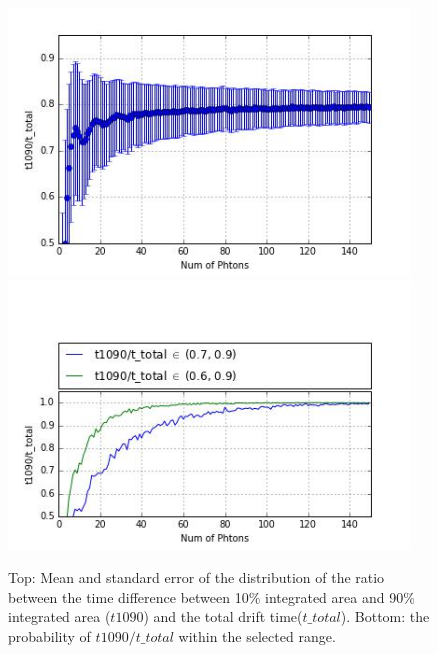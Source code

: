 \begin{figure}[!ht]
  \centering
  \includegraphics[width=0.95\textwidth]
  {Figures/Ch10/PhotonSim_TotalTime10000_T1090_MeanStd.jpg}
    \includegraphics[width=0.95\textwidth]
  {Figures/Ch10/PhotonSim_TotalTime10000_T1090_selectionEff.jpg}
  \caption{Top: Mean and standard error of the distribution of the ratio between the time difference between 10\% integrated area and 90\% integrated area ($t1090$) and the total drift time($t\_total$). Bottom: the probability of $t1090/t\_total$ within the selected range.}
  \label{fig: t1090 vs photon num }
\end{figure}

